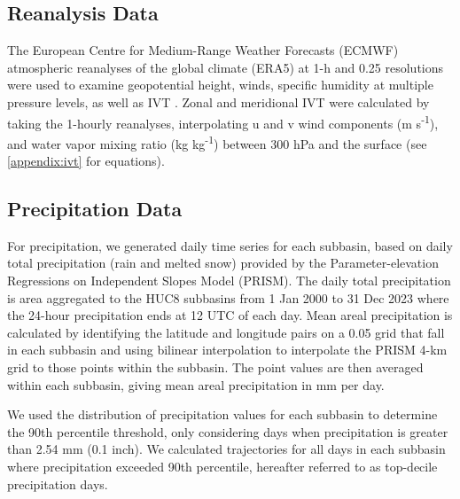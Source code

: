 \documentclass[draft]{agujournal2019}
\begin{document}
\subsection{Reanalysis Data}

The European Centre for Medium-Range Weather Forecasts (ECMWF) atmospheric reanalyses of the global climate (ERA5) at 1-h and  0.25\textdegree{} resolutions were used to examine geopotential height, winds, specific humidity at multiple pressure levels, as well as IVT \cite{Hersbach2020}. Zonal and meridional IVT were calculated by taking the 1-hourly reanalyses, interpolating u and v wind components (m s\textsuperscript{-1}), and water vapor mixing ratio (kg kg\textsuperscript{-1}) between 300 hPa and the surface (see \ref{appendix:ivt} for equations).


\subsection{Precipitation Data}

For precipitation, we generated daily time series for each subbasin, based on daily total precipitation (rain and melted snow) provided by the Parameter-elevation Regressions on Independent Slopes Model (PRISM). The daily total precipitation is area aggregated to the HUC8 subbasins from 1 Jan 2000 to 31 Dec 2023 where the 24-hour precipitation ends at 12 UTC of each day. Mean areal precipitation is calculated by identifying the latitude and longitude pairs on a 0.05\textdegree{} grid that fall in each subbasin and using bilinear interpolation to interpolate the PRISM 4-km grid to those points within the subbasin. The point values are then averaged within each subbasin, giving mean areal precipitation in mm per day. 


We used the distribution of precipitation values for each subbasin to determine the 90th percentile threshold, only considering days when precipitation is greater than 2.54 mm (0.1 inch). We calculated trajectories for all days in each subbasin where precipitation exceeded 90th percentile, hereafter referred to as top-decile precipitation days.
\end{document}
